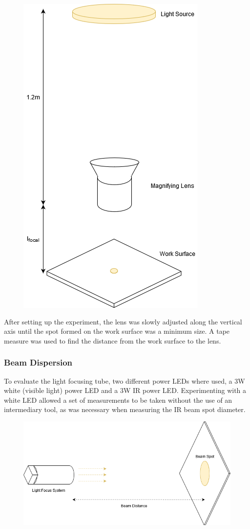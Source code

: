 \begin{figure}[H]
	\centering
	\includegraphics[width=.4\linewidth]{figures/experimentation/focal_length.png}
	\label{fig:focal_length_experiemnt}
\end{figure}

After setting up the experiment, the lens was slowly adjusted along the vertical axis until the spot formed on the work surface was a minimum size. A tape measure was used to find the distance from the work surface to the lens.

\subsubsection{Beam Dispersion}

To evaluate the light focusing tube, two different power LEDs where used, a 3W white (visible light) power LED and a 3W IR power LED. Experimenting with a white LED allowed a set of measurements to be taken without the use of an intermediary tool, as was necessary when measuring the IR beam spot diameter.

\begin{figure}[H]
	\centering
	\includegraphics[width=.7\linewidth]{figures/experimentation/beam_spot_experiement.png}
	\label{fig:focus_system_experiemnt}
\end{figure}


